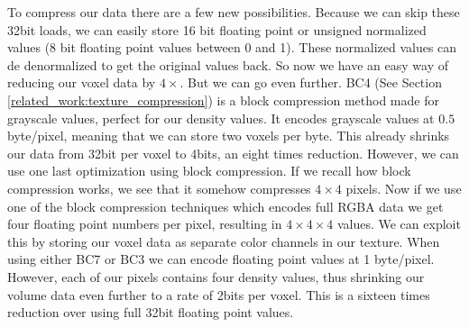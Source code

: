 To compress our data there are a few new possibilities. Because we can skip these 32bit loads, we can easily store 16 bit floating point or unsigned normalized values (8 bit floating point values between 0 and 1). These normalized values can de denormalized to get the original values back. So now we have an easy way of reducing our voxel data by $4\times$. But we can go even further. BC4 (See Section \ref{related_work:texture_compression}) is a block compression method made for grayscale values, perfect for our density values. It encodes grayscale values at $0.5$ byte/pixel, meaning that we can store two voxels per byte. This already shrinks our data from 32bit per voxel to 4bits, an eight times reduction. However, we can use one last optimization using block compression. If we recall how block compression works, we see that it somehow compresses $4\times 4$ pixels. Now if we use one of the block compression techniques which encodes full RGBA data we get four floating point numbers per pixel, resulting in $4 \times 4 \times 4$ values. We can exploit this by storing our voxel data as separate color channels in our texture. When using either BC7 or BC3 we can encode floating point values at 1 byte/pixel. However, each of our pixels contains four density values, thus shrinking our volume data even further to a rate of 2bits per voxel. This is a sixteen times reduction over using full 32bit floating point values.

